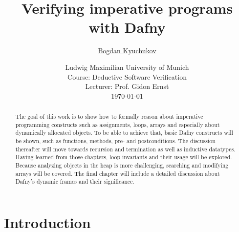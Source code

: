 \documentclass[a4paper]{article}
\begin{document}
\title{
	\vspace{1cm}
	\Huge Verifying imperative programs \\ with Dafny \\
}

\vspace{1cm}

\author{\Large \href{mailto:B.Kyuchukov@campus.lmu.de}{Bogdan Kyuchukov}
	\vspace{1cm}}

\date{
	\large Ludwig Maximilian University of Munich \\ Course: Deductive Software Verification \\
	\vspace{0.8cm}
	\large Lecturer: Prof. Gidon Ernst\\
	\vspace{1cm}
	\today
}

\maketitle
\setlength{\parindent}{0pt}

\vspace{2cm}
\begin{abstract}
	The goal of this work is to show how to formally reason
	about imperative programming constructs such as
	assignments, loops, arrays and especially about dynamically allocated objects. To be able to achieve that, basic
	Dafny constructs will be shown, such as functions, methods, pre- and postconditions. The discussion thereafter will move
	towards recursion and termination as well as inductive datatypes. Having learned from those chapters,
	loop invariants and their usage will be explored. Because analyzing objects in the heap is more challenging,
	searching and modifying arrays will be covered. The final chapter will include a detailed discussion about Dafny's
	dynamic frames and their significance.
\end{abstract}
\newpage
\tableofcontents
\newpage

\section{Introduction} %
\label{sec:introduction}
\end{document}
